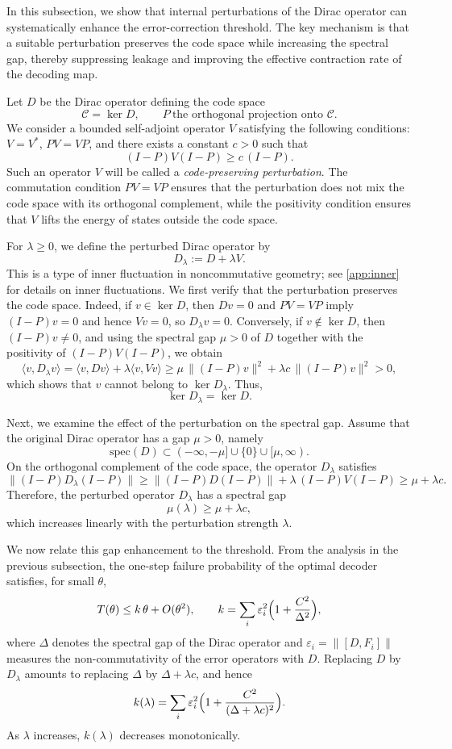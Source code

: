 \documentclass[12pt]{article}
\theoremstyle{definition} %
\theoremstyle{plain} %
\theoremstyle{remark} %
\theoremstyle{underline}
\begin{document}
In this subsection, we show that internal perturbations of the Dirac operator can systematically enhance the error-correction threshold.
The key mechanism is that a suitable perturbation preserves the code space while increasing the spectral gap, thereby suppressing leakage and improving the effective contraction rate of the decoding map.

Let $D$ be the Dirac operator defining the code space
\[
    \mathcal C=\ker D,
    \qquad
    P\ \text{the orthogonal projection onto }\mathcal C.
\]
We consider a bounded self-adjoint operator $V$ satisfying the following conditions: $V=V^*$, $PV=VP$, and there exists a constant $c>0$ such that
\[
    (I-P)V(I-P)\ge c\,(I-P).
\]
Such an operator $V$ will be called a \emph{code-preserving perturbation}. The commutation condition $PV=VP$ ensures that the perturbation does not mix the code space with its orthogonal complement, while the positivity condition ensures that $V$ lifts the energy of states outside the code space.

For $\lambda\ge 0$, we define the perturbed Dirac operator by
\[
    D_\lambda:=D+\lambda V.
\]
This is a type of inner fluctuation in noncommutative geometry; see
\ref{app:inner} for details on inner fluctuations.
We first verify that the perturbation preserves the code space.
Indeed, if $v\in\ker D$, then $Dv=0$ and $PV=VP$ imply $(I-P)v=0$ and hence $Vv=0$, so $D_\lambda v=0$.
Conversely, if $v\notin\ker D$, then $(I-P)v\neq 0$, and using the spectral gap $\mu>0$ of $D$ together with the positivity of $(I-P)V(I-P)$, we obtain
\[
    \langle v,D_\lambda v\rangle
    =
    \langle v,Dv\rangle+\lambda\langle v,Vv\rangle
    \ge
    \mu\,\|(I-P)v\|^2+\lambda c\,\|(I-P)v\|^2
    >
    0,
\]
which shows that $v$ cannot belong to $\ker D_\lambda$.
Thus,
\[
    \ker D_\lambda=\ker D.
\]

Next, we examine the effect of the perturbation on the spectral gap.
Assume that the original Dirac operator has a gap $\mu>0$, namely
\[
    \mathrm{spec}(D)\subset(-\infty,-\mu]\cup\{0\}\cup[\mu,\infty).
\]
On the orthogonal complement of the code space, the operator $D_\lambda$ satisfies
\[
    \|(I-P)D_\lambda(I-P)\|
    \ge
    \|(I-P)D(I-P)\|+\lambda\,(I-P)V(I-P)
    \ge
    \mu+\lambda c.
\]
Therefore, the perturbed operator $D_\lambda$ has a spectral gap
\[
    \mu(\lambda)\ge \mu+\lambda c,
\]
which increases linearly with the perturbation strength $\lambda$.

We now relate this gap enhancement to the threshold.
From the analysis in the previous subsection, the one-step failure probability of the optimal decoder satisfies, for small $\theta$,
\[
    T(\theta)\le k\,\theta+O(\theta^2),
    \qquad
    k=\sum_i \varepsilon_i^2\Bigl(1+\frac{C^2}{\Delta^2}\Bigr),
\]
where $\Delta$ denotes the spectral gap of the Dirac operator and
$\varepsilon_i=\|[D,F_i]\|$ measures the non-commutativity of the error operators with $D$.
Replacing $D$ by $D_\lambda$ amounts to replacing $\Delta$ by $\Delta+\lambda c$, and hence
\[
    k(\lambda)
    =
    \sum_i \varepsilon_i^2
    \Bigl(1+\frac{C^2}{(\Delta+\lambda c)^2}\Bigr).
\]
As $\lambda$ increases, $k(\lambda)$ decreases monotonically.
\end{document}
